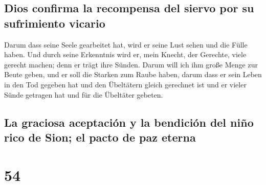 \hypertarget{dios-confirma-la-recompensa-del-siervo-por-su-sufrimiento-vicario}{%
\subsection{Dios confirma la recompensa del siervo por su sufrimiento
vicario}\label{dios-confirma-la-recompensa-del-siervo-por-su-sufrimiento-vicario}}

 Darum dass seine Seele gearbeitet hat, wird er seine
Lust sehen und die Fülle haben. Und durch seine Erkenntnis wird er, mein
Knecht, der Gerechte, viele gerecht machen; denn er trägt ihre Sünden.
 Darum will ich ihm große Menge zur Beute geben, und er
soll die Starken zum Raube haben, darum dass er sein Leben in den Tod
gegeben hat und den Übeltätern gleich gerechnet ist und er vieler Sünde
getragen hat und für die Übeltäter gebeten.

\hypertarget{la-graciosa-aceptaciuxf3n-y-la-bendiciuxf3n-del-niuxf1o-rico-de-sion-el-pacto-de-paz-eterna}{%
\subsection{La graciosa aceptación y la bendición del niño rico de Sion;
el pacto de paz
eterna}\label{la-graciosa-aceptaciuxf3n-y-la-bendiciuxf3n-del-niuxf1o-rico-de-sion-el-pacto-de-paz-eterna}}

\hypertarget{section-53}{%
\section{54}\label{section-53}}


